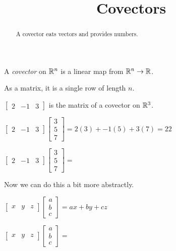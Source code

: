 \documentclass{ximera}
\title{Covectors}
\begin{document}
\begin{abstract}
  A covector eats vectors and provides numbers.
\end{abstract}
\maketitle

\begin{definition}
  A \textit{covector} on $\mathbb R^n$ is a linear map from $\mathbb R^n \to \mathbb R$.

  As a matrix, it is a single row of length $n$.
\end{definition}

\begin{example}
  $\begin{bmatrix} 2 & -1 & 3 \end{bmatrix}$ is the matrix of a
  covector on $\mathbb R^3$.
\end{example}

\begin{question}
  \begin{solution}
    \begin{hint}
      $\begin{bmatrix} 2 & -1 & 3 \end{bmatrix} \begin{bmatrix} 3\\5\\7 \end{bmatrix} = 2(3)+-1(5)+3(7) = 22$
    \end{hint}
    $\begin{bmatrix} 2 & -1 & 3 \end{bmatrix} \begin{bmatrix} 3\\5\\7 \end{bmatrix} = $
  \end{solution}

  Now we can do this a bit more abstractly.

  \begin{hint}
    $\begin{bmatrix} x & y & z \end{bmatrix} \begin{bmatrix} a \\b\\c\end{bmatrix} = ax+by+cz$ 
  \end{hint}
  $\begin{bmatrix} x & y & z \end{bmatrix} \begin{bmatrix} a \\b\\c\end{bmatrix} =$ 
\end{question}
\end{document}
